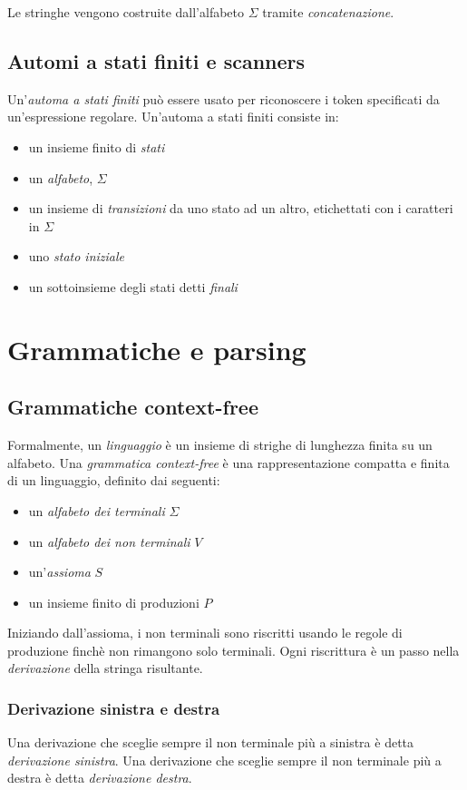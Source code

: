 \documentclass[11pt]{article}
\begin{document}
Le stringhe vengono costruite dall'alfabeto $\Sigma$ tramite \textit{concatenazione}.
\subsection{Automi a stati finiti e scanners}
Un'\textit{automa a stati finiti} può essere usato per riconoscere i token specificati da un'espressione regolare. 
Un'automa a stati finiti consiste in:
\begin{itemize}
    \item un insieme finito di \textit{stati}
    \item un \textit{alfabeto}, $\Sigma$
    \item un insieme di \textit{transizioni} da uno stato ad un altro, etichettati con i caratteri in $\Sigma$
    \item uno \textit{stato iniziale}
    \item un sottoinsieme degli stati detti \textit{finali}
\end{itemize}
\section{Grammatiche e parsing}
\subsection{Grammatiche context-free}
Formalmente, un \textit{linguaggio} è un insieme di strighe di lunghezza finita su un alfabeto. Una \textit{grammatica 
context-free} è una rappresentazione compatta e finita di un linguaggio, definito dai seguenti:
\begin{itemize}
    \item un \textit{alfabeto dei terminali} $\Sigma$
    \item un \textit{alfabeto dei non terminali} $V$
    \item un'\textit{assioma} $S$
    \item un insieme finito di produzioni $P$
\end{itemize}
Iniziando dall'assioma, i non terminali sono riscritti usando le regole di produzione finchè non rimangono solo terminali.
Ogni riscrittura è un passo nella \textit{derivazione} della stringa risultante.
\subsubsection{Derivazione sinistra e destra}
Una derivazione che sceglie sempre il non terminale più a sinistra è detta \textit{derivazione sinistra}.
Una derivazione che sceglie sempre il non terminale più a destra è detta \textit{derivazione destra}.
\end{document}
